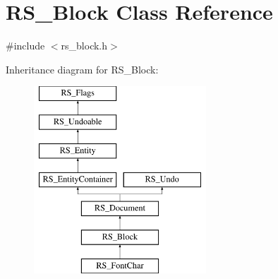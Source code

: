 \hypertarget{classRS__Block}{\section{R\-S\-\_\-\-Block Class Reference}
\label{classRS__Block}
}


{\ttfamily \#include $<$rs\-\_\-block.\-h$>$}

Inheritance diagram for R\-S\-\_\-\-Block\-:\begin{figure}[H]
\begin{center}
\leavevmode
\includegraphics[height=7.000000cm]{classRS__Block}
\end{center}
\end{figure}

